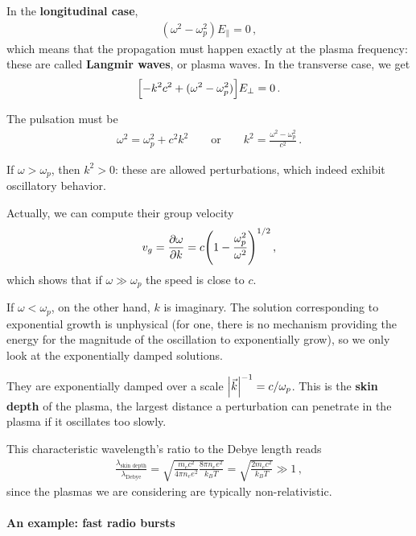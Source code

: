 \documentclass[main.tex]{subfiles}
\begin{document}
In the \textbf{longitudinal case},
%
\begin{align}
(\omega^2 - \omega _p^2) E_{\parallel} = 0
\,,
\end{align}
%
which means that the propagation must happen exactly at the plasma frequency: these are called \textbf{Langmir waves}, or plasma waves. 
In the transverse case, we get 
%
\begin{align}
\qty[ - k^2 c^2 + (\omega^2 - \omega _p^2)] E_\perp = 0
\,.
\end{align}

The pulsation must be 
%
\begin{align}
\omega^2 = \omega _p^2 + c^2 k^2
\qquad \text{or} \qquad
k^2 = \frac{\omega^2 - \omega^2_p}{c^2}
\,.
\end{align}

If \(\omega > \omega _p\), then \(k^2 > 0 \): these are allowed perturbations, which indeed exhibit oscillatory behavior.

Actually, we can compute their group velocity 
%
\begin{align}
v_g = \pdv{\omega }{k} = c \qty(1 - \frac{\omega_p^2}{\omega^2})^{1/2}
\,,
\end{align}
%
which shows that if \(\omega \gg \omega _p\) the speed is close to \(c\). 

If \(\omega < \omega _p\), on the other hand, \(k\) is imaginary.
The solution corresponding to exponential growth is unphysical (for one, there is no mechanism providing the energy for the magnitude of the oscillation to exponentially grow), so we only look at the exponentially damped solutions. 

They are exponentially damped over a scale \(\abs{\vec{k}}^{-1} = c / \omega _p\).
This is the \textbf{skin depth} of the plasma, the largest distance a perturbation can penetrate in the plasma if it oscillates too slowly.

This characteristic wavelength's ratio to the Debye length reads 
%
\begin{align}
\frac{\lambda _{\text{skin depth}}}{ \lambda _{\text{Debye}}} 
= \sqrt{\frac{m_e c^2}{4 \pi n_e e^2} \frac{8 \pi n_e e^2}{k_B T}}
= \sqrt{\frac{2 m_e c^2}{k_B T}} \gg 1
\,,
\end{align}
%
since the plasmas we are considering are typically non-relativistic. 

\paragraph{An example: fast radio bursts}
\end{document}
